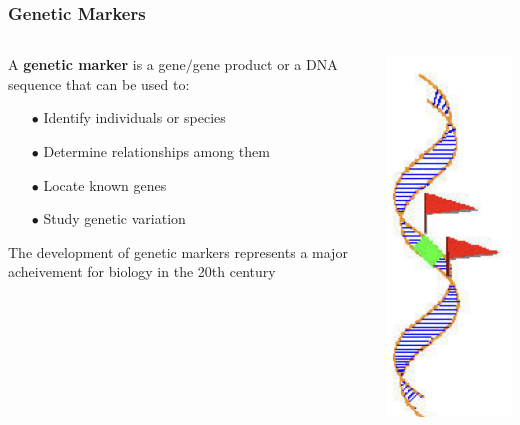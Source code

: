 \documentclass{beamer}
\begin{document}
\begin{frame}
		
	\frametitle{Genetic Markers }

\begin{columns}
	\begin{column}{0.7\textwidth}
	A \textbf{genetic marker} is a gene$/$gene product or a DNA sequence that can be used to:
	\begin{itemize}
		\item[$\bullet$] Identify individuals or species
		\item[$\bullet$] Determine relationships among them
		\item[$\bullet$] Locate known genes 
		\item[$\bullet$] Study genetic variation

	\end{itemize} 

The development of genetic markers represents a major acheivement for biology in the 20th century

\end{column}
\begin{column}{0.3\textwidth}
	\includegraphics[keepaspectratio, height  = 0.7\textheight]{img/geneticMarker}
\end{column}

\end{columns}

\end{frame}
\end{document}
